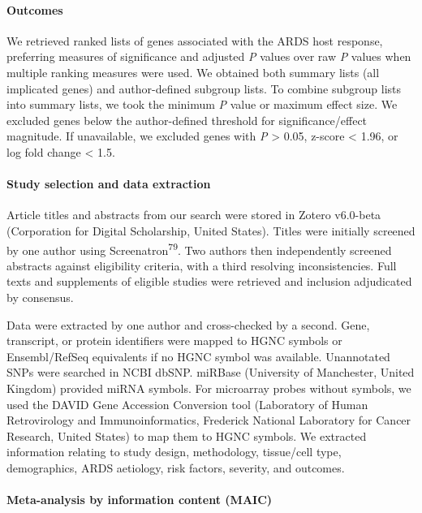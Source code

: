 \documentclass[
  11,
  a4paper,
]{article}
\let\oldparagraph\paragraph
\renewcommand{\paragraph}[1]{\oldparagraph{#1}\mbox{}}
\begin{document}
\paragraph{Outcomes}\label{outcomes}

We retrieved ranked lists of genes associated with the ARDS host
response, preferring measures of significance and adjusted \emph{P}
values over raw \emph{P} values when multiple ranking measures were
used. We obtained both summary lists (all implicated genes) and
author-defined subgroup lists. To combine subgroup lists into summary
lists, we took the minimum \emph{P} value or maximum effect size. We
excluded genes below the author-defined threshold for
significance/effect magnitude. If unavailable, we excluded genes with
\emph{P} \textgreater{} 0.05, z-score \textless{} 1.96, or log fold
change \textless{} 1.5.

\paragraph{Study selection and data
extraction}\label{study-selection-and-data-extraction}

Article titles and abstracts from our search were stored in Zotero
v6.0-beta (Corporation for Digital Scholarship, United States). Titles
were initially screened by one author using
Screenatron\textsuperscript{79}. Two authors then independently screened
abstracts against eligibility criteria, with a third resolving
inconsistencies. Full texts and supplements of eligible studies were
retrieved and inclusion adjudicated by consensus.

Data were extracted by one author and cross-checked by a second. Gene,
transcript, or protein identifiers were mapped to HGNC symbols or
Ensembl/RefSeq equivalents if no HGNC symbol was available. Unannotated
SNPs were searched in NCBI dbSNP. miRBase (University of Manchester,
United Kingdom) provided miRNA symbols. For microarray probes without
symbols, we used the DAVID Gene Accession Conversion tool (Laboratory of
Human Retrovirology and Immunoinformatics, Frederick National Laboratory
for Cancer Research, United States) to map them to HGNC symbols. We
extracted information relating to study design, methodology, tissue/cell
type, demographics, ARDS aetiology, risk factors, severity, and
outcomes.

\paragraph{Meta-analysis by information content
(MAIC)}\label{meta-analysis-by-information-content-maic-1}
\end{document}
